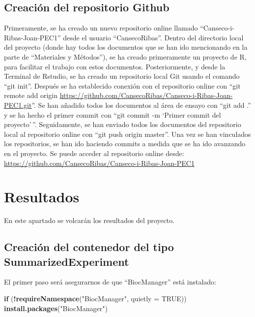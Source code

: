 \documentclass[
]{article}
\newenvironment{Shaded}{\begin{snugshade}}{\end{snugshade}}
\newcommand{\AttributeTok}[1]{\textcolor[rgb]{0.13,0.29,0.53}{#1}}
\newcommand{\ConstantTok}[1]{\textcolor[rgb]{0.56,0.35,0.01}{#1}}
\newcommand{\ControlFlowTok}[1]{\textcolor[rgb]{0.13,0.29,0.53}{\textbf{#1}}}
\newcommand{\FunctionTok}[1]{\textcolor[rgb]{0.13,0.29,0.53}{\textbf{#1}}}
\newcommand{\NormalTok}[1]{#1}
\newcommand{\SpecialCharTok}[1]{\textcolor[rgb]{0.81,0.36,0.00}{\textbf{#1}}}
\newcommand{\StringTok}[1]{\textcolor[rgb]{0.31,0.60,0.02}{#1}}
\begin{document}
\subsection{Creación del repositorio
Github}\label{creaciuxf3n-del-repositorio-github}

Primeramente, se ha creado un nuevo repositorio online llamado
``Canseco-i-Ribas-Joan-PEC1'' desde el usuario ``CansecoRibas''. Dentro
del directorio local del proyecto (donde hay todos los documentos que se
han ido mencionando en la parte de ``Materiales y Métodos''), se ha
creado primeramente un proyecto de R, para facilitar el trabajo con
estos documentos. Posteriormente, y desde la Terminal de Rstudio, se ha
creado un repositorio local Git usando el comando ``git init''. Después
se ha establecido conexión con el repositorio online con ``git remote
add origin
\url{https://github.com/CansecoRibas/Canseco-i-Ribas-Joan-PEC1.git}''.
Se han añadido todos los documentos al área de ensayo con ``git add .''
y se ha hecho el primer commit con ``git commit -m `Primer commit del
proyecto'\,''. Seguidamente, se han enviado todos los documentos del
repositorio local al repositorio online con ``git push origin master''.
Una vez se han vinculados los repositorios, se han ido haciendo commits
a medida que se ha ido avanzando en el proyecto. Se puede acceder al
repositorio online desde:
\url{https://github.com/CansecoRibas/Canseco-i-Ribas-Joan-PEC1}

\section{Resultados}\label{resultados}

En este apartado se volcarán los resultados del proyecto.

\subsection{Creación del contenedor del tipo
SummarizedExperiment}\label{creaciuxf3n-del-contenedor-del-tipo-summarizedexperiment}

El primer paso será asegurarnos de que ``BiocManager'' está instalado:

\begin{Shaded}
\begin{Highlighting}[]
\ControlFlowTok{if}\NormalTok{ (}\SpecialCharTok{!}\FunctionTok{requireNamespace}\NormalTok{(}\StringTok{"BiocManager"}\NormalTok{, }\AttributeTok{quietly =} \ConstantTok{TRUE}\NormalTok{)) }\FunctionTok{install.packages}\NormalTok{(}\StringTok{"BiocManager"}\NormalTok{)}
\end{Highlighting}
\end{Shaded}
\end{document}
